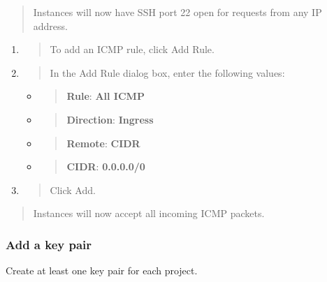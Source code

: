 {\begin{quote}
Instances will now have SSH port 22 open for requests from any IP address.
\end{quote}

\begin{enumerate}
\def\labelenumi{\arabic{enumi}.}
\item
  \begin{quote}
  To add an ICMP rule, click Add Rule.
  \end{quote}
\item
  \begin{quote}
  In the Add Rule dialog box, enter the following values:
  \end{quote}

  \begin{itemize}
  \item
    \begin{quote}
    \textbf{Rule}: \textbf{All ICMP}
    \end{quote}
  \item
    \begin{quote}
    \textbf{Direction}: \textbf{Ingress}
    \end{quote}
  \item
    \begin{quote}
    \textbf{Remote}: \textbf{CIDR}
    \end{quote}
  \item
    \begin{quote}
    \textbf{CIDR}: \textbf{0.0.0.0/0}
    \end{quote}
  \end{itemize}
\item
  \begin{quote}
  Click Add.
  \end{quote}
\end{enumerate}

\begin{quote}
Instances will now accept all incoming ICMP packets.
\end{quote}

\subsubsection{Add a key pair}\label{add-a-key-pair}

Create at least one key pair for each project.

}
